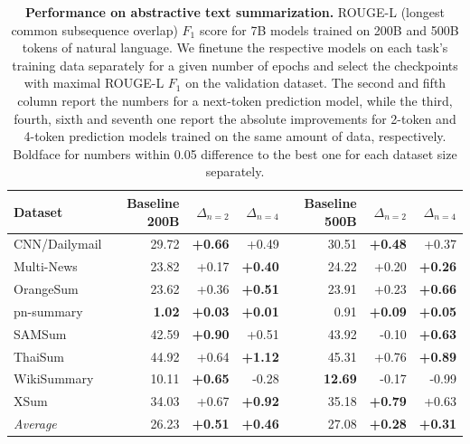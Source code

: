 \documentclass{article}
\theoremstyle{plain}
\theoremstyle{definition}
\theoremstyle{remark}
\begin{document}
\begin{table}[ht!] 
\centering
\caption{\textbf{Performance on abstractive text summarization.} ROUGE-L (longest common subsequence overlap) $F_1$ score for 7B models trained on 200B and 500B tokens of natural language. We finetune the respective models on each task's training data separately for a given number of epochs and select the checkpoints with maximal ROUGE-L $F_1$ on the validation dataset. The second and fifth column report the numbers for a next-token prediction model, while the third, fourth, sixth and seventh one report the absolute improvements for 2-token and 4-token prediction models trained on the same amount of data, respectively.
Boldface for numbers within 0.05 difference to the best one for each dataset size separately.}
\label{tab:summarization}
\begin{tabular}{lrrrrrr}
\toprule
      Dataset &     Baseline 200B &  $\Delta_{n=2}$ &  $\Delta_{n=4}$ & Baseline 500B & $\Delta_{n=2}$ & $\Delta_{n=4}$ \\
\midrule
CNN/Dailymail &  29.72 &         \textbf{+0.66} &         +0.49 &  30.51 &         \textbf{+0.48} &         +0.37 \\
Multi-News &  23.82 &         +0.17 &         \textbf{+0.40} &  24.22 &         +0.20 &         \textbf{+0.26} \\
OrangeSum &  23.62 &         +0.36 &         \textbf{+0.51} &  23.91 &         +0.23 &         \textbf{+0.66} \\
pn-summary &   \textbf{1.02} &         \textbf{+0.03} &         \textbf{+0.01} &   0.91 &         \textbf{+0.09} &         \textbf{+0.05} \\
SAMSum &  42.59 &         \textbf{+0.90} &         +0.51 &  43.92 &        -0.10 &         \textbf{+0.63} \\
ThaiSum &  44.92 &         +0.64 &         \textbf{+1.12} &  45.31 &         +0.76 &         \textbf{+0.89} \\
WikiSummary &  10.11 &         \textbf{+0.65} &        -0.28 &  \textbf{12.69} &        -0.17 &        -0.99 \\
XSum &  34.03 &         +0.67 &         \textbf{+0.92} &  35.18 &         \textbf{+0.79} &         +0.63 \\
         \midrule
\emph{Average} &  26.23 & \textbf{+0.51} & \textbf{+0.46} & 27.08 & \textbf{+0.28} & \textbf{+0.31} \\
\bottomrule
\end{tabular}
\end{table}
\end{document}
